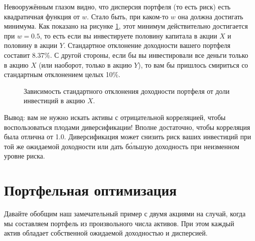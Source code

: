 Невооружённым глазом видно, что дисперсия портфеля (то есть риск) есть квадратичная функция от $w$. Стало быть, при каком-то $w$ она должна достигать минимума. Как показано на рисунке \ref{portfolio_volatility_vs_w}, этот минимум действительно достигается при $w=0.5$, то есть если вы инвестируете половину капитала в акции $X$ и половину в акции $Y$. Стандартное отклонение доходности вашего портфеля составит 8.37\%. С другой стороны, если бы вы инвестировали все деньги только в акцию $X$ (или наоборот, только в акцию $Y$), то вам бы пришлось смириться со стандартным отклонением целых 10\%.

\begin{figure}[h!]
\centering
{}
\caption{Зависимость стандартного отклонения доходности портфеля от доли инвестиций в акцию $X$.}
\label{portfolio_volatility_vs_w}
\end{figure}

Вывод: вам не нужно искать активы с отрицательной корреляцией, чтобы воспользоваться плодами диверсификации! Вполне достаточно, чтобы корреляция была отлична от 1.0. Диверсификация может снизить риск ваших инвестиций при той же ожидаемой доходности или дать б\'{о}льшую доходность при неизменном уровне риска.

\section*{Портфельная оптимизация}

Давайте обобщим наш замечательный пример с двумя акциями на случай, когда мы составляем портфель из произвольного числа активов. При этом каждый актив обладает собственной ожидаемой доходностью и дисперсией.

